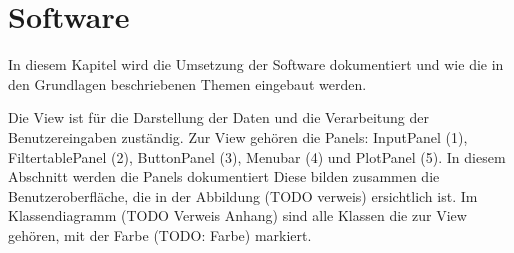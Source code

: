 
\section{Software} \label{sec:software}
In diesem Kapitel wird die Umsetzung der Software dokumentiert und wie die in den Grundlagen beschriebenen Themen eingebaut werden. 



Die View ist für die Darstellung der Daten und die Verarbeitung der Benutzereingaben zuständig. Zur View gehören die Panels: InputPanel (1), FiltertablePanel (2), ButtonPanel (3), Menubar (4) und PlotPanel (5). In diesem Abschnitt werden die Panels dokumentiert Diese bilden zusammen die Benutzeroberfläche, die in der Abbildung (TODO verweis) ersichtlich ist. Im Klassendiagramm (TODO Verweis Anhang) sind alle Klassen die zur View gehören, mit der Farbe (TODO: Farbe) markiert.












